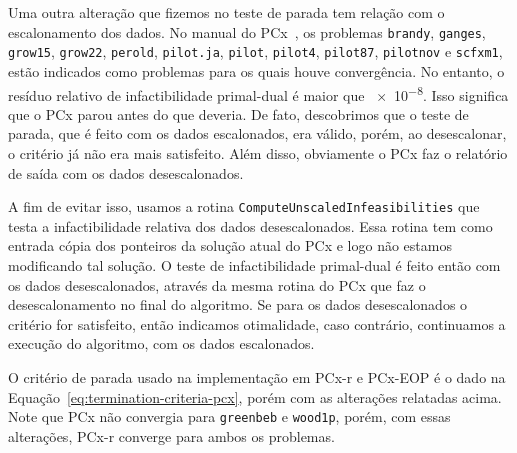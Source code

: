 Uma outra alteração  que fizemos no teste de parada tem relação com o escalonamento dos dados. No manual do PCx~\cite[p. 20]{Czyzyk:1998vw},  os problemas \texttt{brandy}, \texttt{ganges}, \texttt{grow15}, \texttt{grow22}, \texttt{perold}, \texttt{pilot.ja}, \texttt{pilot}, \texttt{pilot4}, \texttt{pilot87}, \texttt{pilotnov} e \texttt{scfxm1}, estão indicados como problemas para os quais houve convergência. No entanto, o resíduo relativo de infactibilidade primal-dual é maior que \num{e-8}. Isso significa que o PCx parou antes do que deveria. De fato, descobrimos que  o teste de parada, que é feito com os dados escalonados, era válido, porém, ao desescalonar, o critério já não era mais satisfeito. Além disso, obviamente o PCx faz o relatório de saída com os dados desescalonados. 

A fim de evitar isso, usamos a rotina \verb|ComputeUnscaledInfeasibilities| que testa a infactibilidade relativa dos dados desescalonados. Essa rotina tem como entrada cópia dos ponteiros da solução atual do PCx e logo não estamos modificando tal solução. O teste de infactibilidade primal-dual é feito então com os dados desescalonados, através da mesma rotina do PCx que  faz o desescalonamento no final do algoritmo. Se para os dados desescalonados o critério for satisfeito, então indicamos otimalidade, caso contrário, continuamos a execução do algoritmo, com os dados escalonados. 


O critério de parada usado  na implementação em PCx-r e PCx-EOP é o dado na Equação~\eqref{eq:termination-criteria-pcx}, porém com  as alterações relatadas acima. Note que PCx não convergia para \texttt{greenbeb} e \texttt{wood1p}, porém, com essas alterações, PCx-r converge para ambos os problemas. 









